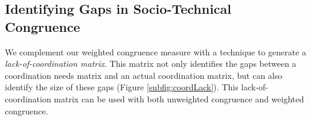 \documentclass[12pt,oneside]{book}
\begin{document}

%	


\subsection{Identifying Gaps in Socio-Technical Congruence}
\label{sec:lack}

We complement our
weighted congruence measure with a technique to generate a \emph{lack-of-coordination matrix}. This matrix not only identifies the
gaps between a coordination needs matrix and an actual coordination matrix, but can also identify the size of these gaps (Figure \ref{subfig:coordLack}). This lack-of-coordination matrix can be used with both unweighted congruence and weighted congruence.
\end{document}
